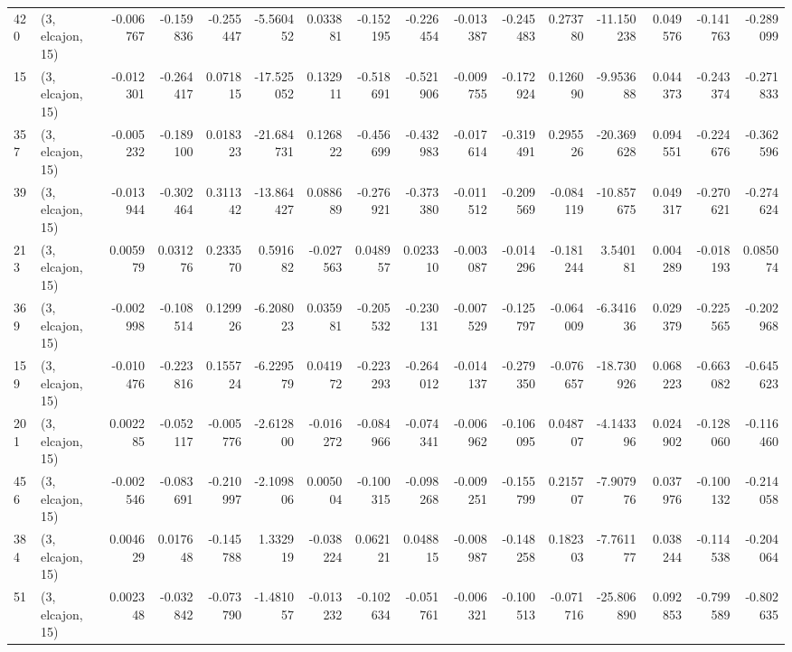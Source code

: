 \begin{tabular}{llrrrrrrrrrrrrrr}
420 &  (3, elcajon, 15) &  -0.006767 & -0.159836 & -0.255447 &   -5.560452 &  0.033881 &  -0.152195 & -0.226454 & -0.013387 & -0.245483 &  0.273780 &  -11.150238 &  0.049576 & -0.141763 & -0.289099 \\
15  &  (3, elcajon, 15) &  -0.012301 & -0.264417 &  0.071815 &  -17.525052 &  0.132911 &  -0.518691 & -0.521906 & -0.009755 & -0.172924 &  0.126090 &   -9.953688 &  0.044373 & -0.243374 & -0.271833 \\
357 &  (3, elcajon, 15) &  -0.005232 & -0.189100 &  0.018323 &  -21.684731 &  0.126822 &  -0.456699 & -0.432983 & -0.017614 & -0.319491 &  0.295526 &  -20.369628 &  0.094551 & -0.224676 & -0.362596 \\
39  &  (3, elcajon, 15) &  -0.013944 & -0.302464 &  0.311342 &  -13.864427 &  0.088689 &  -0.276921 & -0.373380 & -0.011512 & -0.209569 & -0.084119 &  -10.857675 &  0.049317 & -0.270621 & -0.274624 \\
213 &  (3, elcajon, 15) &   0.005979 &  0.031276 &  0.233570 &    0.591682 & -0.027563 &   0.048957 &  0.023310 & -0.003087 & -0.014296 & -0.181244 &    3.540181 &  0.004289 & -0.018193 &  0.085074 \\
369 &  (3, elcajon, 15) &  -0.002998 & -0.108514 &  0.129926 &   -6.208023 &  0.035981 &  -0.205532 & -0.230131 & -0.007529 & -0.125797 & -0.064009 &   -6.341636 &  0.029379 & -0.225565 & -0.202968 \\
159 &  (3, elcajon, 15) &  -0.010476 & -0.223816 &  0.155724 &   -6.229579 &  0.041972 &  -0.223293 & -0.264012 & -0.014137 & -0.279350 & -0.076657 &  -18.730926 &  0.068223 & -0.663082 & -0.645623 \\
201 &  (3, elcajon, 15) &   0.002285 & -0.052117 & -0.005776 &   -2.612800 & -0.016272 &  -0.084966 & -0.074341 & -0.006962 & -0.106095 &  0.048707 &   -4.143396 &  0.024902 & -0.128060 & -0.116460 \\
456 &  (3, elcajon, 15) &  -0.002546 & -0.083691 & -0.210997 &   -2.109806 &  0.005004 &  -0.100315 & -0.098268 & -0.009251 & -0.155799 &  0.215707 &   -7.907976 &  0.037976 & -0.100132 & -0.214058 \\
384 &  (3, elcajon, 15) &   0.004629 &  0.017648 & -0.145788 &    1.332919 & -0.038224 &   0.062121 &  0.048815 & -0.008987 & -0.148258 &  0.182303 &   -7.761177 &  0.038244 & -0.114538 & -0.204064 \\
51  &  (3, elcajon, 15) &   0.002348 & -0.032842 & -0.073790 &   -1.481057 & -0.013232 &  -0.102634 & -0.051761 & -0.006321 & -0.100513 & -0.071716 &  -25.806890 &  0.092853 & -0.799589 & -0.802635 \\

\end{tabular}
